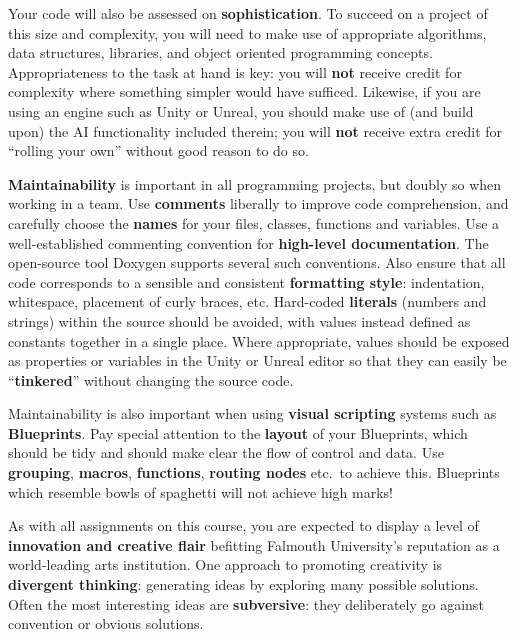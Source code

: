 \documentclass{../../fal_assignment}
\begin{document}
Your code will also be assessed on \textbf{sophistication}.
To succeed on a project of this size and complexity,
you will need to make use of appropriate algorithms, data structures, libraries, and object oriented programming concepts.
Appropriateness to the task at hand is key:
you will \textbf{not} receive credit for complexity  
where something simpler would have sufficed.
Likewise, if you are using an engine such as Unity or Unreal,
you should make use of (and build upon) the AI functionality included therein;
you will \textbf{not} receive extra credit for ``rolling your own'' without good reason to do so.

\textbf{Maintainability} is important in all programming projects,
but doubly so when working in a team.
Use \textbf{comments} liberally to improve code comprehension,
and carefully choose the \textbf{names} for your files, classes, functions and variables.
Use a well-established commenting convention
for \textbf{high-level documentation}.
The open-source tool Doxygen supports several such conventions.
Also ensure that all code corresponds to a sensible and consistent \textbf{formatting style}:
indentation, whitespace, placement of curly braces, etc.
Hard-coded \textbf{literals} (numbers and strings) within the source should be avoided,
with values instead defined as constants together in a single place.
Where appropriate, values should be exposed as properties or variables in the Unity or Unreal editor
so that they can easily be ``\textbf{tinkered}'' without changing the source code.

Maintainability is also important when using \textbf{visual scripting} systems such as \textbf{Blueprints}.
Pay special attention to the \textbf{layout} of your Blueprints,
which should be tidy and should make clear the flow of control and data.
Use \textbf{grouping}, \textbf{macros}, \textbf{functions}, \textbf{routing nodes} etc.\ to achieve this.
Blueprints which resemble bowls of spaghetti will not achieve high marks!

As with all assignments on this course, you are expected to display a level of
\textbf{innovation and creative flair} befitting Falmouth University's reputation as a world-leading
arts institution.
One approach to promoting creativity is
\textbf{divergent thinking}: generating ideas by exploring many possible solutions.
Often the most interesting ideas are \textbf{subversive}: they deliberately go against
convention or obvious solutions.

\end{document}

